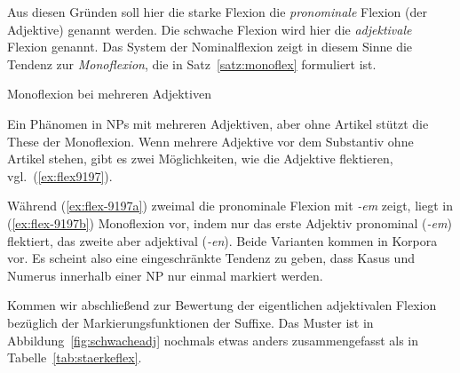 Aus diesen Gründen soll hier die starke Flexion die \textit{pronominale} Flexion (der Adjektive) genannt werden.
Die schwache Flexion wird hier die \textit{adjektivale} Flexion genannt.
Das System der Nominalflexion zeigt in diesem Sinne die Tendenz zur \textit{Monoflexion}, die in Satz~\ref{satz:monoflex} formuliert ist.


\begin{Vertiefung}{Monoflexion bei mehreren Adjektiven}
  
\noindent Ein Phänomen in NPs mit mehreren Adjektiven, aber ohne Artikel stützt die These der Monoflexion.
Wenn mehrere Adjektive vor dem Substantiv ohne Artikel stehen, gibt es zwei Möglichkeiten, wie die Adjektive flektieren, vgl.\ (\ref{ex:flex9197}).

\begin{exe}
  \ex \label{ex:flex9197}
  \begin{xlist}
  \end{xlist}
\end{exe}

Während (\ref{ex:flex-9197a}) zweimal die pronominale Flexion mit \textit{-em} zeigt, liegt in (\ref{ex:flex-9197b}) Monoflexion vor, indem nur das erste Adjektiv pronominal (\textit{-em}) flektiert, das zweite aber adjektival (\textit{-en}).
Beide Varianten kommen in Korpora vor.
Es scheint also eine eingeschränkte Tendenz zu geben, dass Kasus und Numerus innerhalb einer NP nur einmal markiert werden.

\end{Vertiefung}


Kommen wir abschließend zur Bewertung der eigentlichen adjektivalen Flexion bezüglich der Markierungsfunktionen der Suffixe.
Das Muster ist in Abbildung~\ref{fig:schwacheadj} nochmals etwas anders zusammengefasst als in Tabelle~\ref{tab:staerkeflex}.

